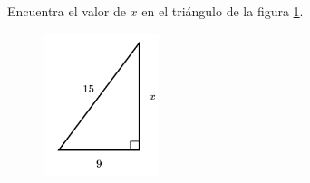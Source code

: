 \question[15]  Encuentra el valor de $x$ en el triángulo de la figura \ref{fig:lados_pitagoras_27}.
\begin{figure}[H]
    \begin{center}
        \includegraphics[width=0.3\textwidth]{../images/lados_pitagoras_27.png}
    \end{center}
    \caption{}
    \label{fig:lados_pitagoras_27}
\end{figure}